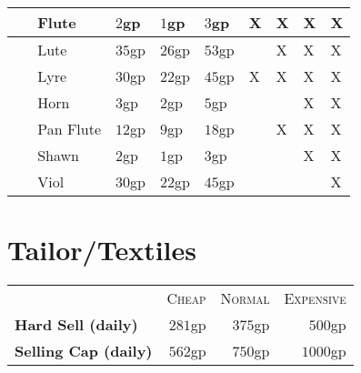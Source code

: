 \documentclass[a5paper,8pt]{book}
\begin{document}
\begin{tabularx}{\textwidth}{|p{0.1cm}lZZZYYYY|}
         ~ & Flute & $2$gp & $1$gp & $3$gp & X & X & X & X \\\hline
         ~ & Lute & $35$gp & $26$gp & $53$gp & ~ & X & X & X \\\hline
         ~ & Lyre & $30$gp & $22$gp & $45$gp & X & X & X & X \\\hline
         ~ & Horn & $3$gp & $2$gp & $5$gp & ~ & ~ & X & X \\\hline
         ~ & Pan Flute & $12$gp & $9$gp & $18$gp & ~ & X & X & X \\\hline
         ~ & Shawn & $2$gp & $1$gp & $3$gp & ~ & ~ & X & X \\\hline
         ~ & Viol & $30$gp & $22$gp & $45$gp & ~ & ~ & ~ & X \\\hline
 \end{tabularx}


\section{Tailor/Textiles}
\begin{tabularx}{\textwidth}{lrrr}
    ~ & \textsc{Cheap} & \textsc{Normal} & \textsc{Expensive}\\
    \textbf{Hard Sell (daily)} & $281$gp & $375$gp & $500$gp\\
    \textbf{Selling Cap (daily)} & $562$gp & $750$gp & $1000$gp\\
\end{tabularx}
\end{document}
